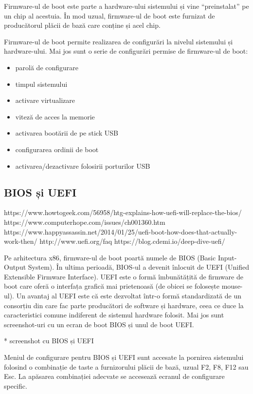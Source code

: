 Firmware-ul de boot este parte a hardware-ului sistemului și vine “preinstalat”
pe un chip al acestuia. În mod uzual, firmware-ul de boot este furnizat de
producătorul plăcii de bază care conține și acel chip.

Firmware-ul de boot permite realizarea de configurări la nivelul sistemului și
hardware-ului. Mai jos sunt o serie de configurări permise de firmware-ul de
boot:

\begin{itemize}
	\item parolă de configurare
	\item timpul sistemului
	\item activare virtualizare
	\item viteză de acces la memorie
	\item activarea bootării de pe stick USB
	\item configurarea ordinii de boot
	\item activarea/dezactivare folosirii porturilor USB
\end{itemize}

\subsection{BIOS și UEFI}
\label{sec:boot-firmware-bios}

https://www.howtogeek.com/56958/htg-explains-how-uefi-will-replace-the-bios/
https://www.computerhope.com/issues/ch001360.htm
https://www.happyassassin.net/2014/01/25/uefi-boot-how-does-that-actually-work-then/
http://www.uefi.org/faq
https://blog.cdemi.io/deep-dive-uefi/

Pe arhitectura x86, firmware-ul de boot poartă numele de BIOS (Basic
Input-Output System). În ultima perioadă, BIOS-ul a devenit înlocuit de UEFI
(Unified Extensible Firmware Interface). UEFI este o formă îmbunătățită de
firmware de boot care oferă o interfața grafică mai prietenoasă (de obicei se
folosește mouse-ul). Un avantaj al UEFI este că este dezvoltat într-o formă
standardizată de un consorțiu din care fac parte producători de software și
hardware, ceea ce duce la caracteristici comune indiferent de sistemul hardware
folosit. Mai jos sunt screenshot-uri cu un ecran de boot BIOS și unul de boot
UEFI.

* screenshot cu BIOS și UEFI

Meniul de configurare pentru BIOS și UEFI sunt accesate la pornirea sistemului
folosind o combinație de taste a furnizorului plăcii de bază, uzual F2, F8, F12
sau Esc. La apăsarea combinației adecvate se accesează ecranul de configurare
specific.

